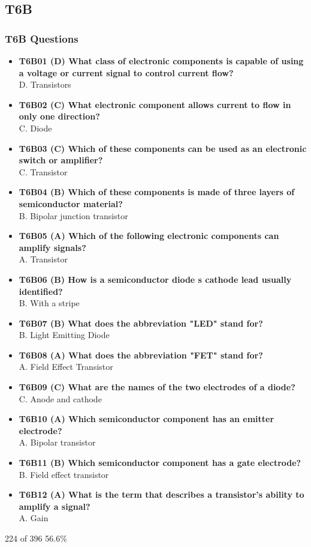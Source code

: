 \documentclass[10pt]{beamer}
\begin{document}
\subsection{T6B}
\begin{frame}
\frametitle{T6B Questions}
\tiny
\begin{itemize}[<+->]
\item\textbf{T6B01 (D) What class of electronic components is capable of using a voltage or current signal to control current flow?}\\D. Transistors
\item\textbf{T6B02 (C) What electronic component allows current to flow in only one direction?}\\C. Diode
\item\textbf{T6B03 (C) Which of these components can be used as an electronic switch or amplifier?}\\C. Transistor
\item\textbf{T6B04 (B) Which of these components is made of three layers of semiconductor material?}\\B. Bipolar junction transistor
\item\textbf{T6B05 (A) Which of the following electronic components can amplify signals?}\\A. Transistor
\item\textbf{T6B06 (B) How is a semiconductor diode s cathode lead usually identified?}\\B. With a stripe
\item\textbf{T6B07 (B) What does the abbreviation "LED" stand for?}\\B. Light Emitting Diode
\item\textbf{T6B08 (A) What does the abbreviation "FET" stand for?}\\A. Field Effect Transistor
\item\textbf{T6B09 (C) What are the names of the two electrodes of a diode?}\\C. Anode and cathode
\item\textbf{T6B10 (A) Which semiconductor component has an emitter electrode?}\\A. Bipolar transistor
\item\textbf{T6B11 (B) Which semiconductor component has a gate electrode?}\\B. Field effect transistor
\item\textbf{T6B12 (A) What is the term that describes a transistor's ability to amplify a signal?}\\A. Gain
\end{itemize}
\tiny 224 of 396  56.6\%
\end{frame}
\end{document}
